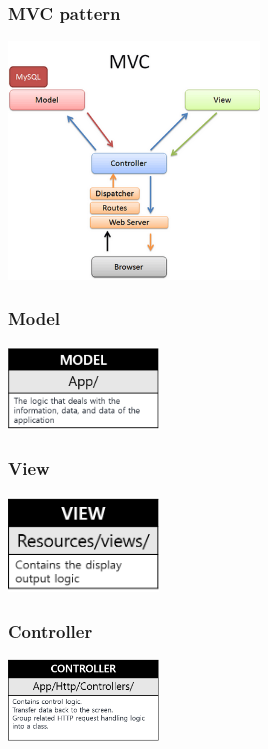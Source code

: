 \documentclass[letterpaper, 10 pt, conference]{ieeeconf}  %
\begin{document}
\subsubsection{MVC pattern}
\begin{center}
\includegraphics[width = 0.5\textwidth]{Architecture/MVC_structure.png}
\end{center}

\subsubsection{Model\\}
\includegraphics[width = 0.3\textwidth]{Architecture/Model.png}
\subsubsection{View\\}
\includegraphics[width = 0.3\textwidth]{Architecture/View.png}
\subsubsection{Controller\\}
\includegraphics[width = 0.3\textwidth]{Architecture/Controller.png}
\end{document}
